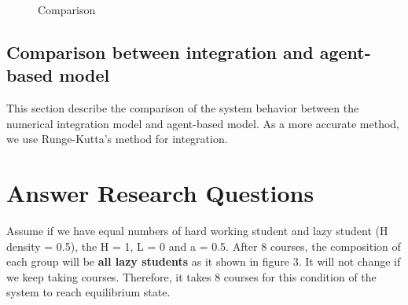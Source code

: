 \documentclass[a4paper, 12pt]{article}
\begin{document}
\begin{figure}[!h]
\begin{minipage}[t]{0.25\textwidth}
		\begin{small}
			\centering
			\vspace{-6mm}
			\caption{\footnotesize Comparison}
		\end{small}
		\label{fig2}
	\end{minipage}
\end{figure}
\vspace{-3mm}
\subsection{Comparison between integration and agent-based model}
This section describe the comparison of the system behavior between the numerical integration model and agent-based model. As a more accurate method, we use Runge-Kutta’s method for integration.

\section{Answer Research Questions}
Assume if we have equal numbers of hard working student and lazy student (H density = 0.5), the H = 1, L = 0 and a = 0.5. After 8 courses, the composition of each group will be \textbf{all lazy students} as it shown in figure 3. It will not change if we keep taking courses. Therefore, it takes 8 courses for this condition of the system to reach equilibrium state. 
\end{document}
